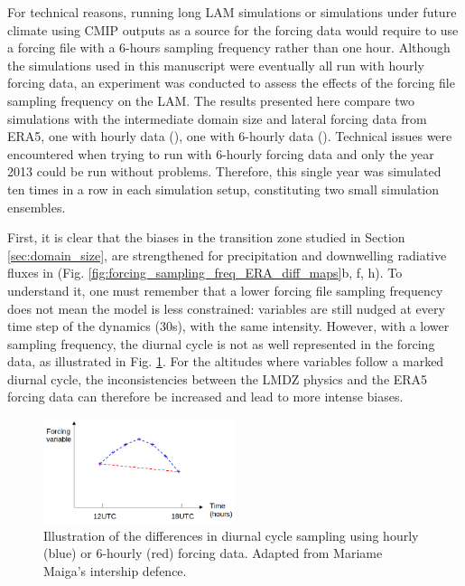 For technical reasons, running long LAM simulations or simulations under future climate using CMIP outputs as a source for the forcing data would require to use a forcing file with a 6-hours sampling frequency rather than one hour. 
Although the simulations used in this manuscript were eventually all run with hourly forcing data, an experiment was conducted to assess the effects of the forcing file sampling frequency on the LAM. 
The results presented here compare two simulations with the intermediate domain size and lateral forcing data from ERA5, one with hourly data (\forcingoneh), one with 6-hourly data (\forcingsixh). Technical issues were encountered when trying to run with 6-hourly forcing data and only the year 2013 could be run without problems. Therefore, this single year was simulated ten times in a row in each simulation setup, constituting two small simulation ensembles.

\hfill

First, it is clear that the biases in the transition zone studied in Section \ref{sec:domain_size}, are strengthened for precipitation and downwelling radiative fluxes in \forcingsixh (Fig. \ref{fig:forcing_sampling_freq_ERA_diff_maps}b, f, h). To understand it, one must remember that a lower forcing file sampling frequency does not mean the model is less constrained: variables are still nudged at every time step of the dynamics (30s), with the same intensity. However, with a lower sampling frequency, the diurnal cycle is not as well represented in the forcing data, as illustrated in Fig. \ref{fig:diurnal_cycle_sampling}. For the altitudes where variables follow a marked diurnal cycle, the inconsistencies between the LMDZ physics and the ERA5 forcing data can therefore be increased and lead to more intense biases.

\begin{figure}[htbp]
    \centering
    \includegraphics[width=0.5\textwidth]{images/chap4/forcing_sampling_freq/sampling_freq_diurnal_cycle.png}    
    \caption{Illustration of the differences in diurnal cycle sampling using hourly (blue) or 6-hourly (red) forcing data. Adapted from Mariame Maiga's intership defence.
    \label{fig:diurnal_cycle_sampling}}
\end{figure}

